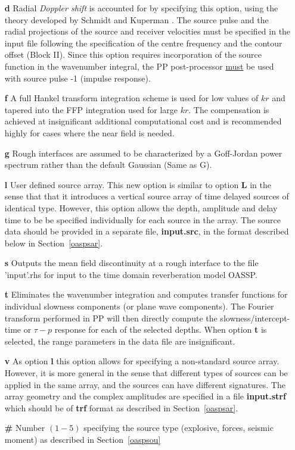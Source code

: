 \begin{itemize}
\item[{\bf d}] Radial {\em Doppler shift} is accounted for by
specifying  this option, using the theory developed by Schmidt and Kuperman
\cite{sk:jasa94}.  The source pulse and the radial projections of the
source and  receiver velocities must be specified in the input file
following the specification of the centre frequency and the contour
offset (Block II). Since this option requires incorporation of the
source function in the wavenumber integral, the PP post-processor
\underline{must} be used with source pulse -1 (impulse response).
    \item[{\bf f}] A full Hankel transform integration scheme is used
for low values of $ kr $ and tapered into the FFP integration used for
large $ kr $. The compensation is achieved at insignificant
additional computational cost and is recommended highly for cases
where the near field is  needed.    
          \item[{\bf g}] Rough interfaces 
          are assumed to be characterized by a Goff-Jordan power
          spectrum rather than the default Gaussian (Same as G).
          \item[{\bf l}] User defined source array. This new option is
          similar to option {\bf L} in the sense that that it
          introduces a vertical source array of time delayed sources
          of identical type. However, this option allows the depth,
          amplitude and delay time to be be specified individually for
          each source in the array. The source data should be provided
          in a separate file, {\bf input.src}, in the format described
          below in Section~\ref{oaspsar}.  
\item[{\bf s}] Outputs the
          mean field discontinuity at a rough interface to the file
          'input'.rhs for input to the time domain reverberation model
          OASSP.  
\item[{\bf t}] Eliminates the wavenumber integration
          and computes transfer functions for individual slowness
          components (or plane wave components). The Fourier transform
          performed in PP will then directly compute the
          slowness/intercept-time or $\tau - p$ response for each of
          the selected depths. When option {\bf t} is selected, the
          range parameters in the data file are insignificant.
\item[{\bf v}] As option {\bf l} this option allows for
          specifying a non-standard source array. However, it is more
          general in the sense that different types of sources can be
          applied in the same array, and the sources can have
          different signatures. The array geometry and the complex
          amplitudes are specified in a file {\bf input.strf} which
          should be of {\bf trf} format as described in
          Section~\ref{oaspsar}. 
 \item[{\bf \#}] Number $(1-5)$
          specifying the source type (explosive, forces, seismic
          moment) as described in Section~\ref{oaspsou}
\end{itemize}


